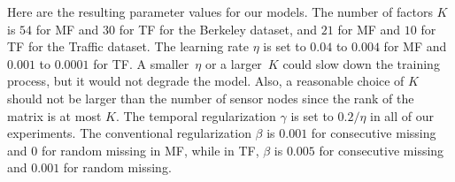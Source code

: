 Here are the resulting parameter values for our models.
The number of factors $K$ is $54$ for MF and $30$ for TF for the Berkeley dataset, and $21$ for MF and $10$ for TF for the Traffic dataset. 
The learning rate $\eta$ is set to $0.04$ to $0.004$ for MF and $0.001$ to $0.0001$ for TF.
A smaller~$\eta$ or a larger~$K$ could slow down the training process, but it would not degrade 
the model.
Also, a reasonable choice of $K$ should not be larger than the number of sensor nodes since the rank of the matrix is at most $K$.
The temporal regularization $\gamma$ is set to $0.2/\eta$ in all of our experiments.
The conventional regularization $\beta$ is $0.001$ for consecutive missing and $0$ for random missing in MF, 
while in TF, $\beta$ is $0.005$ for consecutive missing and $0.001$ for random missing.
